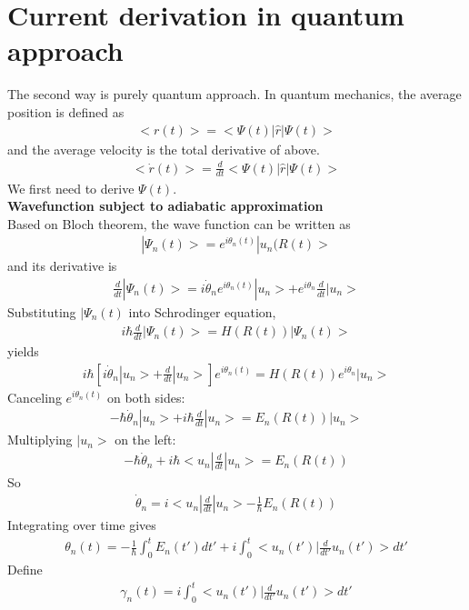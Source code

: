 \documentclass[a4paper]{article}
\begin{document}
\section{Current derivation in quantum approach}
The second way is purely quantum approach. In quantum mechanics, the average position is defined as
\begin{align*}
<r(t)> = <\Psi(t)|\hat r|\Psi(t)>
\end{align*}
and the average velocity is the total derivative of above.
\begin{align*}
<\dot r(t)> = \frac{d}{dt}<\Psi(t)|\hat r|\Psi(t)>
\end{align*}
We first need to derive $\Psi(t)$.\\
{\bf Wavefunction subject to adiabatic approximation }\\
Based on Bloch theorem,  the wave function can be written as
\begin{align*}
|\Psi_n(t)> = e^{i\theta_n(t)} | u_n(R(t)>
\end{align*}
and its derivative is
\begin{align*}
\frac{d}{dt}|\Psi_n(t)> = i \dot \theta_n e^{i\theta_n(t)}|u_n>+ e^{i \theta_n} \frac{d}{dt}|u_n>
\end{align*}
Substituting $|\Psi_n(t)$ into Schrodinger equation, 
\begin{align*}
i \hbar \frac{d}{dt}|\Psi_n(t)> = H(R(t)) |\Psi_n(t)>
\end{align*}
yields
\begin{align*}
i\hbar[i\dot \theta_n |u_n> + \frac{d}{dt}|u_n>]e^{i \theta_n(t)} = H(R(t)) e^{i\theta_n}|u_n>
\end{align*}
Canceling $e^{i \theta_n(t)}$ on both sides:
\begin{align*}
-\hbar\dot \theta_n |u_n> + i \hbar \frac{d}{dt}|u_n> = E_n(R(t)) |u_n>
\end{align*}
Multiplying $|u_n>$ on the left:
\begin{align*}
-\hbar \dot \theta_n + i \hbar <u_n|\frac{d}{dt}|u_n> = E_n(R(t))
\end{align*}
So
\begin{align*}
\dot \theta_n = i <u_n|\frac{d}{dt}|u_n> - \frac{1}{\hbar} E_n(R(t))
\end{align*}
Integrating over time gives
\begin{align*}
\theta_n(t) = - \frac{1}{\hbar} \int_0^t E_n(t')dt'+ i \int_0^t <u_n(t')|\frac{d}{dt'}u_n(t')>dt'
\end{align*}
Define
\begin{align*}
\gamma_n(t) = i\int_0^t <u_n(t')|\frac{d}{dt'}u_n(t')>dt'
\end{align*}
\end{document}
